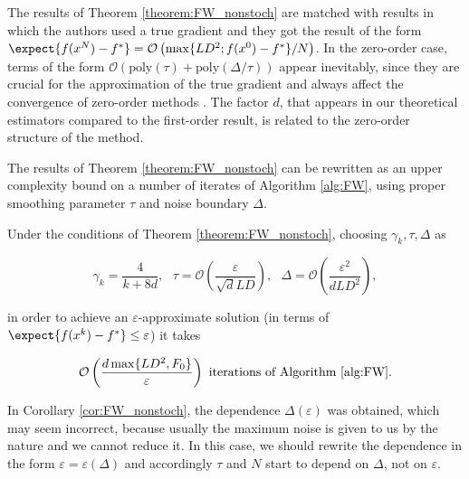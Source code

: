         The results of Theorem \ref{theorem:FW_nonstoch} are matched with results \cite{frank1956algorithm, jaggi2013revisiting} in which the authors used a true gradient and they got the result of the form $\expect{f(x^{N}) - f^*} = \mathcal{O} \left(\max\{LD^2 ; f(x^0) - f^* \}/ N \right)$. In the zero-order case, terms of the form $\mathcal{O}\left(\text{poly}(\tau) + \text{poly}(\Delta / \tau) \right)$ appear inevitably, since they are crucial for the approximation of the true gradient and always affect the convergence of zero-order methods \cite{risteski2016algorithms, sahu2018distributed, liu2018zeroth, beznosikov2020derivative}. The factor $d$, that appears in our theoretical estimators compared to the first-order result, is related to the zero-order structure of the method.



        The results of Theorem \ref{theorem:FW_nonstoch} can be rewritten as an upper complexity bound on a number of iterates of Algorithm \ref{alg:FW}, using proper smoothing parameter $\tau$ and noise boundary $\Delta$.

        \begin{corollary}
        \label{cor:FW_nonstoch}
            Under the conditions of Theorem \ref{theorem:FW_nonstoch}, choosing $\gamma_k, \tau, \Delta$ as

            \begin{equation*}
                \gamma_k = \frac{4}{k + 8d}, \text{ }
                \tau = \mathcal{O} \left(\frac{\varepsilon}{\sqrt{d} L D} \right), \text{ }
                \Delta = \mathcal{O} \left( \frac{\varepsilon^2}{d L D^2}\right),
            \end{equation*}

            in order to achieve an $\varepsilon$-approximate solution (in terms of $\expect{f(x^k) - f^*} \leq \varepsilon$) it takes

            \begin{equation*}
                \mathcal{O} \left( \frac{d \max\{L D^2, F_0\}}{\varepsilon} \right) \text{ iterations of Algorithm \ref{alg:FW}.}
            \end{equation*}
        \end{corollary}

        In Corollary \ref{cor:FW_nonstoch}, the dependence $ \Delta(\varepsilon)$ was obtained, which may seem incorrect, because usually the maximum noise is given to us by the nature and we cannot reduce it. In this case, we should rewrite the dependence in the form $\varepsilon = \varepsilon(\Delta)$ and accordingly $\tau$ and $N$ start to depend on $\Delta$, not on $\varepsilon$.



